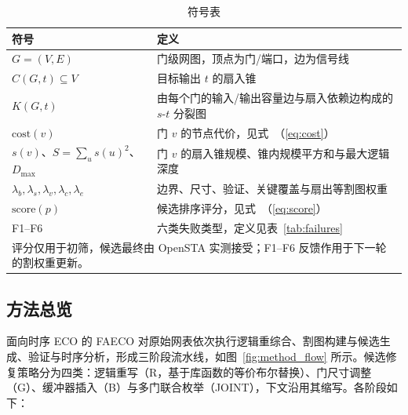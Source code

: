 \documentclass[twocolumn,10pt]{ctexart}
\renewcommand{\eqref}[1]{\textup{（\ref{#1}）}}
\begin{document}
\begin{table}[ht]
\centering
\caption{符号表}
\label{tab:symbols}
\scriptsize
\setlength{\tabcolsep}{2pt}
\renewcommand{\arraystretch}{0.9}
\begin{tabular}{p{2.6cm}p{4.9cm}}
\toprule
\textbf{符号} & \textbf{定义} \\
\midrule
$G = (V, E)$ & 门级网图，顶点为门/端口，边为信号线 \\
$C(G, t) \subseteq V$ & 目标输出 $t$ 的扇入锥 \\
$K(G, t)$ & 由每个门的输入/输出容量边与扇入依赖边构成的 $s$-$t$ 分裂图 \\
$\mathrm{cost}(v)$ & 门 $v$ 的节点代价，见式~\eqref{eq:cost} \\
$s(v)$、$S=\sum_u s(u)^2$、$D_{\max}$ & 门 $v$ 的扇入锥规模、锥内规模平方和与最大逻辑深度 \\
$\lambda_b,\lambda_s,\lambda_v,\lambda_c,\lambda_e$ & 边界、尺寸、验证、关键覆盖与扇出等割图权重 \\
$\mathrm{score}(p)$ & 候选排序评分，见式~\eqref{eq:score} \\
F1--F6 & 六类失败类型，定义见表~\ref{tab:failures} \\
\bottomrule
\multicolumn{2}{p{7.3cm}}{\footnotesize 评分仅用于初筛，候选最终由 OpenSTA 实测接受；F1--F6 反馈作用于下一轮的割权重更新。}\\
\end{tabular}
\end{table}

\subsection{方法总览}\label{sec:overview}

面向时序 ECO 的 FAECO 对原始网表依次执行逻辑重综合、割图构建与候选生成、验证与时序分析，形成三阶段流水线，如图~\ref{fig:method_flow} 所示。候选修复策略分为四类：逻辑重写（R，基于库函数的等价布尔替换）、门尺寸调整（G）、缓冲器插入（B）与多门联合枚举（JOINT），下文沿用其缩写。各阶段如下：
\end{document}
